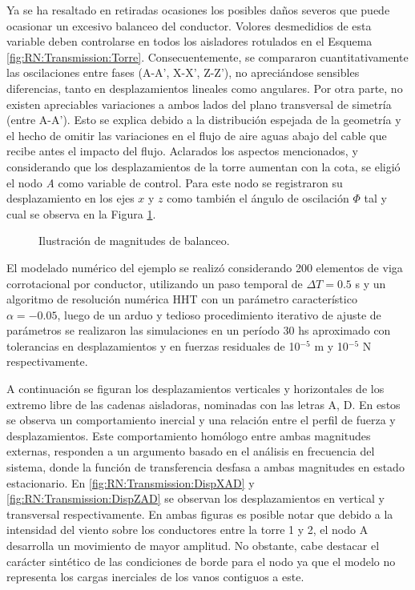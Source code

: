 Ya se ha resaltado en retiradas ocasiones los posibles daños severos que puede ocasionar un excesivo balanceo del conductor. Volores desmedidios de esta variable deben controlarse en todos los aisladores rotulados en el Esquema \ref{fig:RN:Transmission:Torre}. Consecuentemente, se compararon cuantitativamente las oscilaciones entre fases (A-A', X-X', Z-Z'), no apreciándose sensibles diferencias, tanto en desplazamientos lineales como angulares. Por otra parte, no existen apreciables variaciones a ambos lados del plano transversal de simetría (entre A-A'). Esto se explica debido a la distribución espejada de la geometría y el hecho de omitir las variaciones en el flujo de aire aguas abajo del cable que recibe antes el impacto del flujo. Aclarados los aspectos mencionados, y considerando que los desplazamientos de la torre aumentan con la cota, se eligió el nodo \textit{A} como variable de control. Para este nodo se registraron su desplazamiento en los ejes $x$ y $z$ como también el ángulo de oscilación $\Phi$ tal y cual se observa en la Figura \ref{fig:RN:Transmission:Angulo}.

\begin{figure}[htbp]
	\centering
	\def\svgwidth{80mm}
	
	\caption{Ilustración de magnitudes de balanceo.}
	\label{fig:RN:Transmission:Angulo}
\end{figure}

El modelado numérico del ejemplo se realizó considerando 200 elementos de viga corrotacional por conductor, utilizando un paso temporal de $\Delta T =0.5$ s y un algoritmo de resolución numérica HHT con un parámetro característico $\alpha=-0.05$, luego de un arduo y tedioso procedimiento iterativo de ajuste de parámetros se realizaron las simulaciones en un período 30 hs aproximado con tolerancias en desplazamientos y en fuerzas residuales de 10$^{-5}$ m y 10$^{-5}$ N respectivamente.

A continuación se figuran los desplazamientos verticales y horizontales de los extremo libre de las cadenas aisladoras, nominadas con las letras $\text{A}$, $\text{D}$. En estos se observa un comportamiento inercial y una relación entre el perfil de fuerza y desplazamientos. Este comportamiento homólogo entre ambas magnitudes externas, responden a un argumento basado en el análisis en frecuencia del sistema, donde la función de transferencia desfasa a ambas magnitudes en estado estacionario. En \ref{fig:RN:Transmission:DispXAD} y \ref{fig:RN:Transmission:DispZAD} se observan los desplazamientos en vertical y transversal respectivamente. En ambas figuras es posible notar que debido a la intensidad del viento sobre los conductores entre la torre 1 y 2, el nodo $\text{A}$ desarrolla un movimiento de mayor amplitud. No obstante, cabe destacar el carácter sintético de las condiciones de borde para el nodo ya que el modelo no representa los cargas inerciales de los vanos contiguos a este. 


